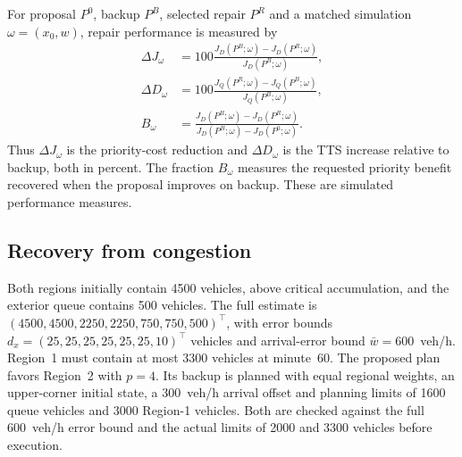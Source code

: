 \documentclass[final]{cas-sc}
\theoremstyle{definition}
\theoremstyle{plain}
\theoremstyle{definition}
\theoremstyle{plain}
\begin{document}
For proposal $P^0$, backup $P^B$, selected repair $P^R$ and a matched
simulation $\omega=(x_0,w)$, repair performance is measured by
\begin{equation}
\begin{aligned}
\Delta J_\omega&=100\frac{J_D(P^B;\omega)-J_D(P^R;\omega)}{J_D(P^B;\omega)},\\
\Delta D_\omega&=100\frac{J_Q(P^R;\omega)-J_Q(P^B;\omega)}{J_Q(P^B;\omega)},\\
B_\omega&=\frac{J_D(P^B;\omega)-J_D(P^R;\omega)}{J_D(P^B;\omega)-J_D(P^0;\omega)}.
\end{aligned}
\label{eq:benchmark-repair-metrics}
\end{equation}
Thus $\Delta J_\omega$ is the priority-cost reduction and
$\Delta D_\omega$ is the TTS increase relative to backup, both in
percent. The fraction $B_\omega$ measures the requested priority benefit
recovered when the proposal improves on backup. These are simulated
performance measures.

\subsection{Recovery from congestion}
\label{sec:congested-results}
\label{sec:controller-benchmarks}
\label{sec:new-mpc-results}

Both regions initially contain 4500 vehicles, above critical
accumulation, and the exterior queue contains 500 vehicles. The full
estimate is $(4500,4500,2250,2250,750,750,500)^\top$, with error bounds
$d_x=(25,25,25,25,25,25,10)^\top$ vehicles and arrival-error bound
$\bar w=600$~veh/h. Region~1 must contain at most 3300 vehicles at
minute~60. The proposed plan favors Region~2 with $p=4$. Its backup is
planned with equal regional weights, an upper-corner initial state,
a 300~veh/h arrival offset and planning limits of 1600 queue vehicles
and 3000 Region-1 vehicles. Both are checked against the full
600~veh/h error bound and the actual limits of 2000 and 3300 vehicles
before execution.
\end{document}
